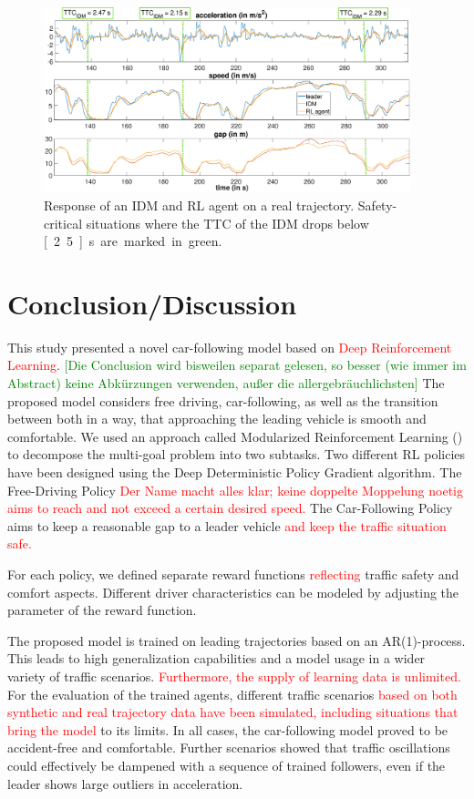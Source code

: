 \documentclass[review]{elsarticle}
\providecommand{\red}[1]{\textcolor{red}{#1}}
\providecommand{\green}[1]{\textcolor{green}{#1}}
\providecommand{\martin}[1]{\red{#1}} %
\providecommand{\martinc}[1]{\green{[#1]}} %
\providecommand{\3}{{\ss}}
\begin{document}
\begin{figure}	
	\centering
	\includegraphics[width=0.95\textwidth]{images/TTC_CaseStudy}
	\caption{Response of an IDM and RL agent on a real trajectory. Safety-critical situations where the TTC of the IDM drops below \unit[2.5]{s} are marked in green.}
	\label{fig:TTC_CaseStudy}
\end{figure}

\section{Conclusion/Discussion}
\label{sec:conclusion}
This study presented a novel car-following model based on
\martin{Deep Reinforcement Learning}. \martinc{Die Conclusion wird
  bisweilen separat gelesen, so besser (wie immer im Abstract) keine
  Abk\"urzungen verwenden, au\3er die allergebr\"auchlichsten} The
proposed model considers free driving, car-following, as well as the
transition between both in a way, that approaching the leading vehicle
is smooth and comfortable. We used an approach called Modularized
Reinforcement Learning (\cite{MRL}) to decompose the multi-goal
problem into two subtasks. Two different RL policies have been
designed using the Deep Deterministic Policy Gradient algorithm. The
Free-Driving Policy \martin{Der Name macht alles klar; keine doppelte
  Moppelung noetig} \martin{aims to reach and not exceed a certain
desired speed.} The Car-Following Policy aims to keep a reasonable gap
to a leader vehicle \martin{and keep the traffic situation safe.} 

For each policy, we defined separate reward functions \martin{reflecting} traffic safety and comfort aspects. 
Different driver characteristics can be modeled by adjusting the parameter of the reward function.

The proposed model is trained on leading trajectories based on an
AR(1)-process. This leads to high generalization capabilities and a
model usage in a wider variety of traffic scenarios. \martin{Furthermore, the
supply of learning data is unlimited.}
For the evaluation of the trained agents, different traffic scenarios
\martin{based on both synthetic and
real trajectory data have been simulated, including situations that
bring the model} to its limits. 
In all cases, the car-following model proved to be accident-free and
comfortable. Further scenarios showed that traffic oscillations could
effectively be dampened with a sequence of trained followers, even if
the leader shows large outliers in acceleration.
\end{document}

